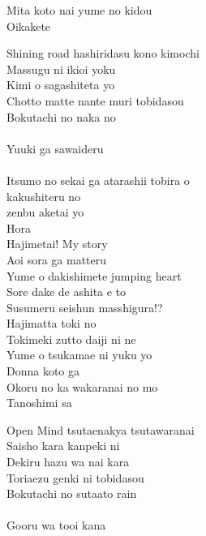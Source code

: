 \def\songtitle{Aozora Jumping Heart}
\def\songcomment{Season 1 Opening Theme}
\def\songlyrics{Aki Hata}
\def\songwriter{Ken Itou \& Hajime Mitsumasu}
\def\songarrange{EFFY}
   
\ifdefined\COMPLETE
\else
	
	
\fi
\thispagestyle{song}

\begin{multicols}{2}\small
Mita koto nai yume no kidou\\
Oikakete\\


Shining road hashiridasu kono kimochi\\
Massugu ni ikioi yoku\\
Kimi o sagashiteta yo\\
Chotto matte nante muri tobidasou\\
Bokutachi no naka no\\
\hspace*{2.1em}\\
Yuuki ga sawaideru\\

\\
Itsumo no sekai ga atarashii tobira o\\
 kakushiteru no\\
 zenbu aketai yo\\
Hora \\

Hajimetai! My story \\
Aoi sora ga matteru \\
Yume o dakishimete jumping heart\\
Sore dake de ashita e to\\
Susumeru seishun masshigura!?\\
Hajimatta toki no \\
Tokimeki zutto daiji ni ne \\
Yume o tsukamae ni yuku yo\\
Donna koto ga\\
Okoru no ka wakaranai no mo\\
Tanoshimi sa\\


Open Mind tsutaenakya tsutawaranai\\
Saisho kara kanpeki ni\\
Dekiru hazu wa nai kara\\
Toriaezu genki ni tobidasou\\
Bokutachi no sutaato rain\\
\hspace*{3.1em}\\
Gooru wa tooi kana\columnbreak


\end{multicols}
